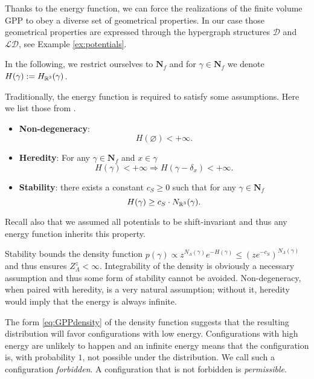 Thanks to the energy function, we can force the realizations of the finite volume GPP to obey a diverse set of geometrical properties. In our case those geometrical properties are expressed through the hypergraph structures $\mathcal D$ and $\mathcal {LD}$, see Example \ref{ex:potentials}. \newline

In the following, we restrict ourselves to $\mathbf N_f$ and for $\gamma \in \mathbf N_f$ we denote $H(\gamma):= H_{\mathbb R^3}(\gamma)$.\newline 

\noindent Traditionally, the energy function is required to satisfy some assumptions. Here we list those from \cite{Dereudre2017}. 
\begin{itemize}
	\item \textbf{Non-degeneracy}:
		$$H(\varnothing) < +\infty.$$
	\item \textbf{Heredity}: For any $\gamma \in \mathbf N_f$ and $x\in \gamma$
		$$H(\gamma)< + \infty \Rightarrow H(\gamma - \delta_x) < +\infty.$$
	\item \textbf{Stability}: there exists a constant $c_S\geq 0$ such that for any $\gamma \in \mathbf N_f$
		$$H(\gamma) \geq c_S\cdot N_{\mathbb R^3} (\gamma).$$
\end{itemize}
Recall also that we assumed all potentials to be shift-invariant and thus any energy function inherits this property.\newline

Stability bounds the density function $p(\gamma) \propto z^{N_\Lambda( \gamma)}e^{-H(\gamma)} \leq (z e^{-c_S})^{N_\Lambda(\gamma)} $ and thus ensures $Z^z_\Lambda < \infty$. Integrability of the density is obviously a necessary assumption and thus some form of stability cannot be avoided. 
Non-degeneracy, when paired with heredity, is a very natural assumption; without it, heredity would imply that the energy is always infinite.\newline

The form \eqref{eq:GPPdensity} of the density function suggests that the resulting distribution will favor configurations with low energy. Configurations with high energy are unlikely to happen and an infinite energy means that the configuration is, with probability $1$, not possible under the distribution. We call such a configuration \textit{forbidden}. A configuration that is not forbidden is \textit{permissible}.  \newline

